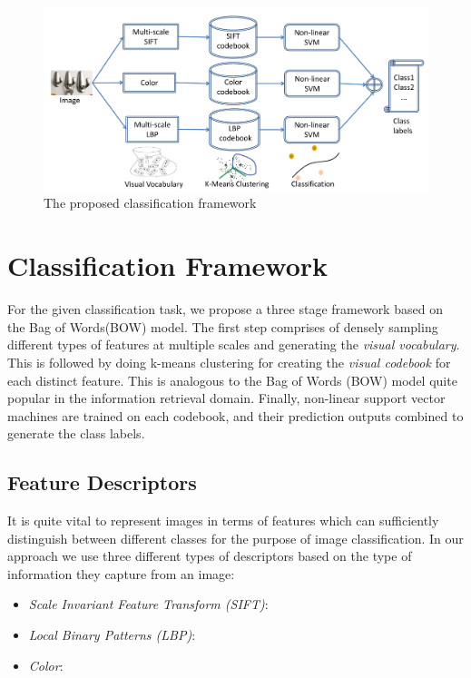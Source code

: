 \documentclass[12pt]{article}
\begin{document}
\begin{figure}
\includegraphics[width = 1\textwidth]{flowchart}
\caption{The proposed classification framework}
\end{figure}

\section{Classification Framework}
For the given classification task, we propose a three stage framework based on the Bag of Words(BOW) model. The first step comprises of densely sampling different types of features at multiple scales and generating the \textit{visual vocabulary}. This is followed by doing k-means clustering for creating the \textit{visual codebook} for each distinct feature. This is analogous to the Bag of Words (BOW) model quite popular in the information retrieval domain. Finally, non-linear support vector machines are trained on each codebook, and their prediction outputs combined to generate the class labels.

\subsection{Feature Descriptors}
It is quite vital to represent images in terms of features which can sufficiently distinguish between different classes for the purpose of image classification. In our approach we use three different types of descriptors based on the type of information they capture from an image:

\begin{itemize}

\item \textit{Scale Invariant Feature Transform (SIFT)}:

\item \textit{Local Binary Patterns (LBP)}:

\item \textit{Color}:

\end{itemize}
\end{document}
